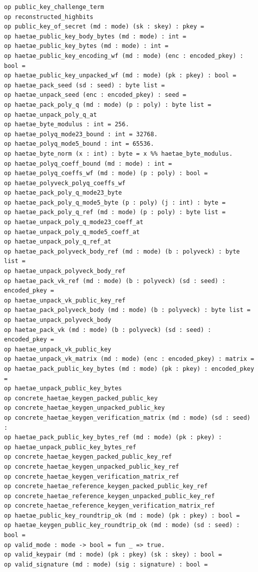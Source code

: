 \begin{lstlisting}[language=EasyCrypt,basicstyle=\ttfamily\tiny]
op public_key_challenge_term
op reconstructed_highbits
op public_key_of_secret (md : mode) (sk : skey) : pkey =
op haetae_public_key_body_bytes (md : mode) : int =
op haetae_public_key_bytes (md : mode) : int =
op haetae_public_key_encoding_wf (md : mode) (enc : encoded_pkey) : bool =
op haetae_public_key_unpacked_wf (md : mode) (pk : pkey) : bool =
op haetae_pack_seed (sd : seed) : byte list =
op haetae_unpack_seed (enc : encoded_pkey) : seed =
op haetae_pack_poly_q (md : mode) (p : poly) : byte list =
op haetae_unpack_poly_q_at
op haetae_byte_modulus : int = 256.
op haetae_polyq_mode23_bound : int = 32768.
op haetae_polyq_mode5_bound : int = 65536.
op haetae_byte_norm (x : int) : byte = x %% haetae_byte_modulus.
op haetae_polyq_coeff_bound (md : mode) : int =
op haetae_polyq_coeffs_wf (md : mode) (p : poly) : bool =
op haetae_polyveck_polyq_coeffs_wf
op haetae_pack_poly_q_mode23_byte
op haetae_pack_poly_q_mode5_byte (p : poly) (j : int) : byte =
op haetae_pack_poly_q_ref (md : mode) (p : poly) : byte list =
op haetae_unpack_poly_q_mode23_coeff_at
op haetae_unpack_poly_q_mode5_coeff_at
op haetae_unpack_poly_q_ref_at
op haetae_pack_polyveck_body_ref (md : mode) (b : polyveck) : byte list =
op haetae_unpack_polyveck_body_ref
op haetae_pack_vk_ref (md : mode) (b : polyveck) (sd : seed) : encoded_pkey =
op haetae_unpack_vk_public_key_ref
op haetae_pack_polyveck_body (md : mode) (b : polyveck) : byte list =
op haetae_unpack_polyveck_body
op haetae_pack_vk (md : mode) (b : polyveck) (sd : seed) : encoded_pkey =
op haetae_unpack_vk_public_key
op haetae_unpack_vk_matrix (md : mode) (enc : encoded_pkey) : matrix =
op haetae_pack_public_key_bytes (md : mode) (pk : pkey) : encoded_pkey =
op haetae_unpack_public_key_bytes
op concrete_haetae_keygen_packed_public_key
op concrete_haetae_keygen_unpacked_public_key
op concrete_haetae_keygen_verification_matrix (md : mode) (sd : seed) :
op haetae_pack_public_key_bytes_ref (md : mode) (pk : pkey) :
op haetae_unpack_public_key_bytes_ref
op concrete_haetae_keygen_packed_public_key_ref
op concrete_haetae_keygen_unpacked_public_key_ref
op concrete_haetae_keygen_verification_matrix_ref
op concrete_haetae_reference_keygen_packed_public_key_ref
op concrete_haetae_reference_keygen_unpacked_public_key_ref
op concrete_haetae_reference_keygen_verification_matrix_ref
op haetae_public_key_roundtrip_ok (md : mode) (pk : pkey) : bool =
op haetae_keygen_public_key_roundtrip_ok (md : mode) (sd : seed) : bool =
op valid_mode : mode -> bool = fun _ => true.
op valid_keypair (md : mode) (pk : pkey) (sk : skey) : bool =
op valid_signature (md : mode) (sig : signature) : bool =

\end{lstlisting}
